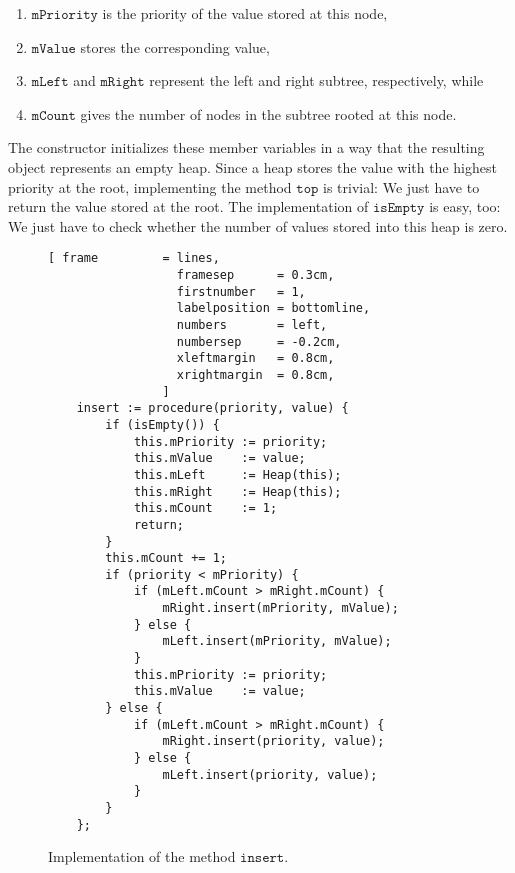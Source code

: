 \begin{enumerate}
\item $\texttt{mPriority}$ is the priority of the value stored at this node,
\item $\texttt{mValue}$    stores the corresponding value,
\item $\texttt{mLeft}$ and $\texttt{mRight}$ represent the left and right subtree, respectively, while
\item $\texttt{mCount}$    gives the number of nodes in the subtree rooted at this node.
\end{enumerate}
The constructor initializes these member variables in a way that the resulting object represents an
empty heap.  Since a heap stores the value with the highest priority at the root, implementing the
method $\texttt{top}$ is trivial: We just have to return the value stored at the root.
The implementation of $\texttt{isEmpty}$ is easy, too: We just have to check whether the number of
values stored into this heap is zero.
\begin{figure}[!ht]
\centering
\begin{Verbatim}[ frame         = lines, 
                  framesep      = 0.3cm, 
                  firstnumber   = 1,
                  labelposition = bottomline,
                  numbers       = left,
                  numbersep     = -0.2cm,
                  xleftmargin   = 0.8cm,
                  xrightmargin  = 0.8cm,
                ]
    insert := procedure(priority, value) {
        if (isEmpty()) {
            this.mPriority := priority;
            this.mValue    := value;
            this.mLeft     := Heap(this);
            this.mRight    := Heap(this);
            this.mCount    := 1;
            return;
        }
        this.mCount += 1;
        if (priority < mPriority) {                         
            if (mLeft.mCount > mRight.mCount) {
                mRight.insert(mPriority, mValue);
            } else {
                mLeft.insert(mPriority, mValue);
            }
            this.mPriority := priority;
            this.mValue    := value;
        } else {
            if (mLeft.mCount > mRight.mCount) { 
                mRight.insert(priority, value);
            } else {
                mLeft.insert(priority, value);
            }
        }
    };
\end{Verbatim}
\vspace*{-0.3cm}
\caption{Implementation of the method $\texttt{insert}$.}
\label{fig:heap.stlx-insert}
\end{figure}

